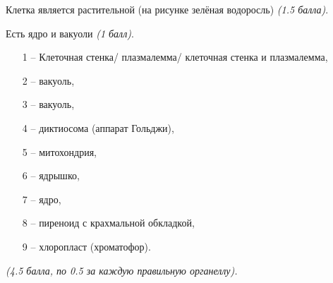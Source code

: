 \explanationSection

Клетка является растительной (на рисунке зелёная водоросль) \textit{(1.5 балла)}.

Есть ядро и вакуоли \textit{(1 балл)}.
\begin{enumerate}
\item [1 –] Клеточная стенка/ плазмалемма/ клеточная стенка и плазмалемма,
\item [2 –] вакуоль,
\item [3 –] вакуоль,
\item [4 –] диктиосома (аппарат Гольджи),
\item [5 –] митохондрия,
\item [6 –] ядрышко,
\item [7 –] ядро,
\item [8 –] пиреноид с крахмальной обкладкой,
\item [9 –] хлоропласт (хроматофор).
\end{enumerate}

\additionalCriteria 

\textit{(4.5 балла, по 0.5 за каждую правильную органеллу).}